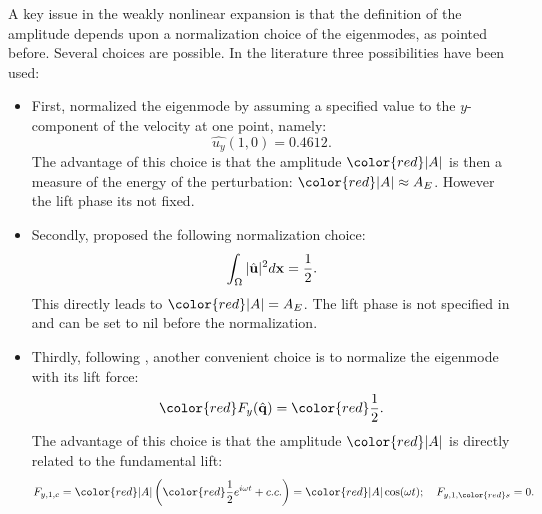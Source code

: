 \documentclass[twocolumn,10pt]{asme2ej}
\newcommand{\be}[1]{ \begin{equation} \label{#1}}
\newcommand{\ee}{\end{equation}}
\begin{document}
\iffalse
\begin{eqnarray}
\begin{aligned}
F_{x,WNL} = F_{x}({\bf q}_{bc})&+\epsilon^2 \big( 
F_{x}({\bf q}_{\epsilon})- 2\mathsf{D}({\bf u}_{bc}) \big)\\
&+F_{x}({\bf q}_{2,0})|A|^2\\
&+2F_{x,r}({\bf q}_{2,2}\cos(2\omega t)+
2F_{x,i}({\bf q}_{2,2}\sin(2\omega t)
),\\
\end{aligned}\\
F_{y,WNL} = |A|^2 \big[ F_{y}({\bf \hat{q}})e^{i\omega_{LC} t} +c.c. \big],
\end{eqnarray}
\fi



{\color{blue}
A key issue in the weakly nonlinear expansion is that the definition of the amplitude depends upon a normalization choice of the eigenmodes{\color{red}, as pointed before}. Several choices are possible. In the literature three possibilities have been used:
\begin{itemize}
\item First, \cite{SippLebedev} normalized the eigenmode by assuming a specified value to the $y$-component of the velocity at one point, namely:
\be{normsipp}
\hat{u_y}(1,0) = 0.4612.
\ee
The advantage of this choice is that the amplitude ${\color{red}|A|}$ is then a measure of the energy of the perturbation: 
${\color{red}|A|} \approx A_E$. {\color{red}However the lift phase its not fixed.}

\item Secondly, \cite{FDR2016} proposed the following {\color{red}normalization} choice:
\be{normFDR}
\int_\Omega |\hat{\bf u}|^2 d {\bf x}  = \frac{1}{2}.
\ee
This directly leads to ${\color{red}|A|} = A_E$.{\color{red} The lift phase is not specified in \cite{FDR2016} and can be set to nil before the normalization.}

\item Thirdly, following \cite{Fabre2012}, another convenient choice is to normalize the eigenmode with its lift 
force: 
\be{normfabre}
{\color{red}F_y(\hat{\bf q}) }={\color{red} \frac{1}{2}}.
\ee
The advantage of this choice is that the amplitude ${\color{red}|A|}$ is directly related to the fundamental lift:
\be{lift_explanation}
F_{y,1,c} 
= {\color{red}|A|} \left( {\color{red}\frac{1}{2}} e^{i \omega t} + c.c. \right)
=   {\color{red}|A|} \cos (\omega t) ; \quad F_{y,1,{\color{red}s}} = 0. 
\ee

\end{itemize}
}
\end{document}
